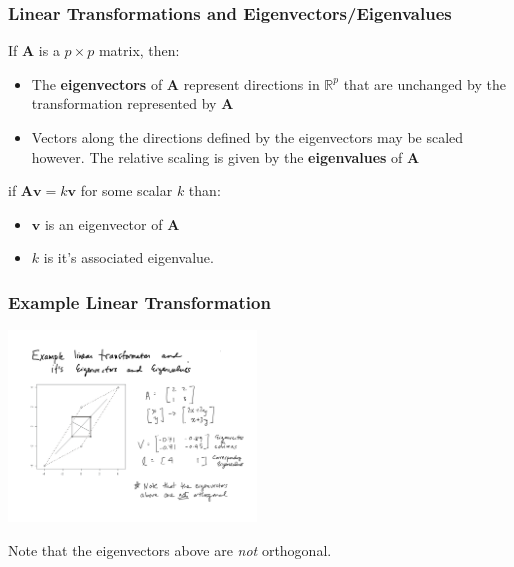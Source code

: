 \documentclass{beamer}
\newcommand{\RealP}{\ensuremath{\mathbb{R}^p}}
\newcommand{\Mtx}[1]{\ensuremath{\mathbf{#1}}}
\begin{document}
\begin{frame}
  \frametitle{Linear Transformations and Eigenvectors/Eigenvalues}

If $\Mtx{A}$ is a $p \times p$ matrix, then:

\begin{itemize}
\item The \textbf{eigenvectors} of $\Mtx{A}$ represent directions in $\RealP$ that are unchanged by the transformation represented by $\Mtx{A}$

\item Vectors along the directions defined by the eigenvectors may be scaled however. The relative scaling is given by the \textbf{eigenvalues} of $\Mtx{A}$

\end{itemize}
\medskip

if $\Mtx{A}\Mtx{v} = k\Mtx{v}$ for some scalar $k$ than:
\begin{itemize}
\item  $\Mtx{v}$ is an eigenvector of $\Mtx{A}$ 
\item $k$ is it's associated eigenvalue.
\end{itemize}

\end{frame}
\begin{frame}
  \frametitle{Example Linear Transformation}

\begin{center}
\includegraphics[height=2in]{eigen-example}
\medskip

Note that the eigenvectors above are \emph{not} orthogonal.

\end{center}  

\end{frame}
\end{document}
